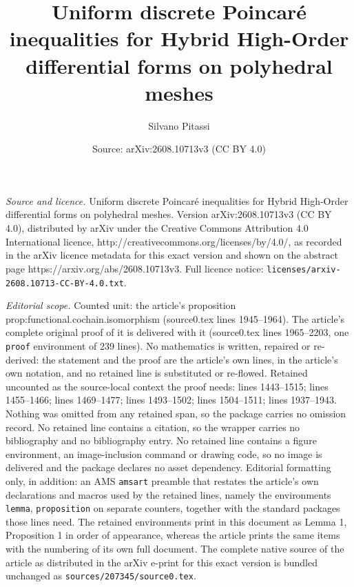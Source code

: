\documentclass[10pt,a4paper]{amsart}
\title{Uniform discrete Poincar\'e inequalities for Hybrid High-Order differential forms on polyhedral meshes}
\author{Silvano Pitassi}
\date{Source: arXiv:2608.10713v3 (CC BY 4.0)}
\begin{document}
\maketitle

\noindent\emph{Source and licence.} Uniform discrete Poincar\'e inequalities for Hybrid High-Order differential forms on polyhedral meshes. Version arXiv:2608.10713v3 (CC BY 4.0), distributed by arXiv under the Creative Commons Attribution 4.0 International licence, http://creativecommons.org/licenses/by/4.0/, as recorded in the arXiv licence metadata for this exact version and shown on the abstract page https://arxiv.org/abs/2608.10713v3. Full licence notice: \texttt{licenses/arxiv-2608.10713-CC-BY-4.0.txt}.\par\smallskip

\noindent\textit{Editorial scope.} Counted unit: the article's proposition prop:functional.cochain.isomorphism (source0.tex lines 1945--1964). The article's complete original proof of it is delivered with it (source0.tex lines 1965--2203, one \texttt{proof} environment of 239 lines). No mathematics is written, repaired or re-derived: the statement and the proof are the article's own lines, in the article's own notation, and no retained line is substituted or re-flowed.  Retained uncounted as the source-local context the proof needs: lines 1443--1515; lines 1455--1466; lines 1469--1477; lines 1493--1502; lines 1504--1511; lines 1937--1943.  Nothing was omitted from any retained span, so the package carries no omission record.  No retained line contains a citation, so the wrapper carries no bibliography and no bibliography entry.  No retained line contains a figure environment, an image-inclusion command or drawing code, so no image is delivered and the package declares no asset dependency.  Editorial formatting only, in addition: an AMS \texttt{amsart} preamble that restates the article's own declarations and macros used by the retained lines, namely the environments \texttt{lemma}, \texttt{proposition} on separate counters, together with the standard packages those lines need.  The retained environments print in this document as Lemma 1, Proposition 1 in order of appearance, whereas the article prints the same items with the numbering of its own full document.  The complete native source of the article as distributed in the arXiv e-print for this exact version is bundled unchanged as \texttt{sources/207345/source0.tex}.
\end{document}
